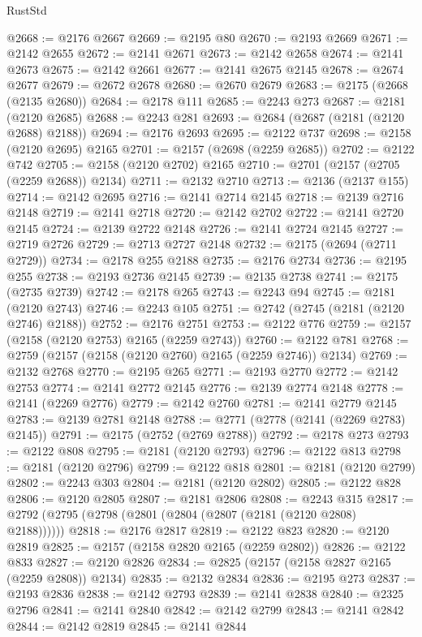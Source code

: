 \begin{lexlean}{RustStd}
\begin{coremodule}
@2668 := @2176 @2667
@2669 := @2195 @80
@2670 := @2193 @2669
@2671 := @2142 @2655
@2672 := @2141 @2671
@2673 := @2142 @2658
@2674 := @2141 @2673
@2675 := @2142 @2661
@2677 := @2141 @2675 @2145
@2678 := @2674 @2677
@2679 := @2672 @2678
@2680 := @2670 @2679
@2683 := @2175 (@2668 (@2135 @2680))
@2684 := @2178 @111
@2685 := @2243 @273
@2687 := @2181 (@2120 @2685)
@2688 := @2243 @281
@2693 := @2684 (@2687 (@2181 (@2120 @2688) @2188))
@2694 := @2176 @2693
@2695 := @2122 @737
@2698 := @2158 (@2120 @2695) @2165
@2701 := @2157 (@2698 (@2259 @2685))
@2702 := @2122 @742
@2705 := @2158 (@2120 @2702) @2165
@2710 := @2701 (@2157 (@2705 (@2259 @2688)) @2134)
@2711 := @2132 @2710
@2713 := @2136 (@2137 @155)
@2714 := @2142 @2695
@2716 := @2141 @2714 @2145
@2718 := @2139 @2716 @2148
@2719 := @2141 @2718
@2720 := @2142 @2702
@2722 := @2141 @2720 @2145
@2724 := @2139 @2722 @2148
@2726 := @2141 @2724 @2145
@2727 := @2719 @2726
@2729 := @2713 @2727 @2148
@2732 := @2175 (@2694 (@2711 @2729))
@2734 := @2178 @255 @2188
@2735 := @2176 @2734
@2736 := @2195 @255
@2738 := @2193 @2736 @2145
@2739 := @2135 @2738
@2741 := @2175 (@2735 @2739)
@2742 := @2178 @265
@2743 := @2243 @94
@2745 := @2181 (@2120 @2743)
@2746 := @2243 @105
@2751 := @2742 (@2745 (@2181 (@2120 @2746) @2188))
@2752 := @2176 @2751
@2753 := @2122 @776
@2759 := @2157 (@2158 (@2120 @2753) @2165 (@2259 @2743))
@2760 := @2122 @781
@2768 := @2759 (@2157 (@2158 (@2120 @2760) @2165 (@2259 @2746)) @2134)
@2769 := @2132 @2768
@2770 := @2195 @265
@2771 := @2193 @2770
@2772 := @2142 @2753
@2774 := @2141 @2772 @2145
@2776 := @2139 @2774 @2148
@2778 := @2141 (@2269 @2776)
@2779 := @2142 @2760
@2781 := @2141 @2779 @2145
@2783 := @2139 @2781 @2148
@2788 := @2771 (@2778 (@2141 (@2269 @2783) @2145))
@2791 := @2175 (@2752 (@2769 @2788))
@2792 := @2178 @273
@2793 := @2122 @808
@2795 := @2181 (@2120 @2793)
@2796 := @2122 @813
@2798 := @2181 (@2120 @2796)
@2799 := @2122 @818
@2801 := @2181 (@2120 @2799)
@2802 := @2243 @303
@2804 := @2181 (@2120 @2802)
@2805 := @2122 @828
@2806 := @2120 @2805
@2807 := @2181 @2806
@2808 := @2243 @315
@2817 := @2792 (@2795 (@2798 (@2801 (@2804 (@2807 (@2181 (@2120 @2808) @2188))))))
@2818 := @2176 @2817
@2819 := @2122 @823
@2820 := @2120 @2819
@2825 := @2157 (@2158 @2820 @2165 (@2259 @2802))
@2826 := @2122 @833
@2827 := @2120 @2826
@2834 := @2825 (@2157 (@2158 @2827 @2165 (@2259 @2808)) @2134)
@2835 := @2132 @2834
@2836 := @2195 @273
@2837 := @2193 @2836
@2838 := @2142 @2793
@2839 := @2141 @2838
@2840 := @2325 @2796
@2841 := @2141 @2840
@2842 := @2142 @2799
@2843 := @2141 @2842
@2844 := @2142 @2819
@2845 := @2141 @2844

\end{coremodule}
\end{lexlean}
